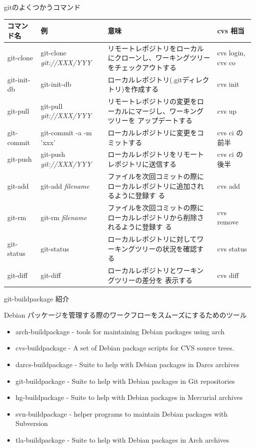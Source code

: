 \documentclass[cjk,dvipdfmx,12pt]{beamer}
\begin{document}
\begin{frame}{gitのよくつかうコマンド}

{\tiny 
\begin{tabular}{|l|l|p{15em}|l|}
\hline
\hline
コマンド名 &例 &意味 & cvs 相当\\
\hline
git-clone & git-clone {\it git://XXX/YYY} & 
 リモートレポジトリをローカルにクローンし、ワーキングツリーをチェックアウトする & cvs login, cvs co \\
\hline
git-init-db & git-init-db &
 ローカルレポジトリ(.gitディレクトリ)を作成する & cvs init\\
\hline
git-pull & git-pull {\it git://XXX/YYY} &
 リモートレポジトリの変更をローカルにマージし、ワーキングツリーを
 アップデートする & cvs up \\
\hline
git-commit & git-commit -a -m 'xxx' & 
 ローカルレポジトリに変更をコミットする & cvs ci の前半\\
\hline
git-push & git-push {\it git://XXX/YYY} & 
 ローカルレポジトリをリモートレポジトリに送信する & cvs ci の後半\\ 
\hline
git-add & git-add {\it filename}&
 ファイルを次回コミットの際にローカルレポジトリに追加されるように登録す
 る & cvs add \\
\hline
git-rm & git-rm {\it filename} & 
 ファイルを次回コミットの際にローカルレポジトリから削除されるように登録す
 る & cvs remove \\
\hline
git-status & git-status & 
 ローカルレポジトリに対してワーキングツリーの状況を確認する &
 cvs status\\
\hline
git-diff & git-diff & ローカルレポジトリとワーキングツリーの差分を
 表示する & cvs diff\\
\hline
\hline
\end{tabular}
}
\end{frame}

\begin{frame}{git-buildpackage 紹介}
 
Debian パッケージを管理する際のワークフローをスムーズにするためのツール
{\tiny 
\begin{itemize}
 \item arch-buildpackage - tools for maintaining Debian packages using arch
 \item cvs-buildpackage - A set of Debian package scripts for CVS source trees.
 \item darcs-buildpackage - Suite to help with Debian packages in Darcs archives
 \item git-buildpackage - Suite to help with Debian packages in Git repositories
 \item hg-buildpackage - Suite to help with Debian packages in Mercurial archives
 \item svn-buildpackage - helper programs to maintain Debian packages with Subversion
 \item tla-buildpackage - Suite to help with Debian packages in Arch archives
\end{itemize}
}
\end{frame}
\end{document}
